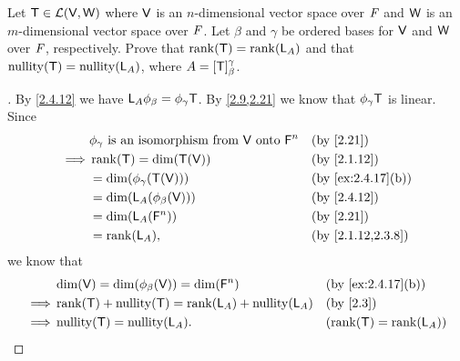 \setcounter{ex}{19}
\begin{ex}\label{ex:2.4.20}
  Let \(\mathsf{T} \in \mathcal{L}(\mathsf{V}, \mathsf{W})\) where \(\mathsf{V}\) is an \(n\)-dimensional vector space over \(\mathit{F}\) and \(\mathsf{W}\) is an \(m\)-dimensional vector space over \(\mathit{F}\).
  Let \(\beta\) and \(\gamma\) be ordered bases for \(\mathsf{V}\) and \(\mathsf{W}\) over \(\mathit{F}\), respectively.
  Prove that \(\rk{\T} = \rk{\L_A}\) and that \(\nt{\T} = \nt{\L_A}\), where \(A = [\mathsf{T}]_{\beta}^{\gamma}\).
\end{ex}

\begin{proof}[]
  By \cref{2.4.12} we have \(\mathsf{L}_A \phi_{\beta} = \phi_{\gamma} \mathsf{T}\).
  By \cref{2.9,2.21} we know that \(\phi_{\gamma} \mathsf{T}\) is linear.
  Since
  \begin{align*}
             & \phi_{\gamma} \text{ is an isomorphism from } \V \text{ onto } \vs{F}^n &  & \by{2.21}         \\
    \implies & \rk{\T} = \dim(\T(\V))                                                  &  & \by{2.1.12}       \\
             & = \dim(\phi_{\gamma}(\T(\V)))                                           &  & \by{ex:2.4.17}[b] \\
             & = \dim(\L_A(\phi_{\beta}(\V)))                                          &  & \by{2.4.12}       \\
             & = \dim(\L_A(\vs{F}^n))                                                  &  & \by{2.21}         \\
             & = \rk{\L_A},                                                            &  & \by{2.1.12,2.3.8}
  \end{align*}
  we know that
  \begin{align*}
             & \dim(\V) = \dim(\phi_{\beta}(\V)) = \dim(\vs{F}^n) &  & \by{ex:2.4.17}[b]     \\
    \implies & \rk{\T} + \nt{\T} = \rk{\L_A} + \nt{\L_A}          &  & \by{2.3}              \\
    \implies & \nt{\T} = \nt{\L_A}.                               &  & (\rk{\T} = \rk{\L_A})
  \end{align*}
\end{proof}

